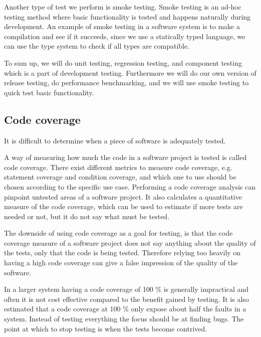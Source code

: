 \bigskip

Another type of test we perform is smoke testing.
Smoke testing is an ad-hoc testing method where basic functionality is tested and happens naturally during development\cite{smoke_testing}.
An example of smoke testing in a software system is to make a compilation and see if it succeeds, since we use a statically typed language,
we can use the type system to check if all types are compatible.

To sum up, we will do unit testing, regression testing, and component testing which is a part of development testing. 
Furthermore we will do our own version of release testing, do performance benchmarking, 
and we will use smoke testing to quick test basic functionality.

\subsection{Code coverage}\label{subsec:code_coverage}
It is difficult to determine when a piece of software is adequately tested.

A way of measuring how much the code in a software project is tested is called code coverage.
There exist different metrics to measure code coverage, e.g. statement coverage and condition coverage,
and which one to use should be chosen according to the specific use case.
Performing a code coverage analysis can pinpoint untested areas of a software project.
It also calculates a quantitative measure of the code coverage, 
which can be used to estimate if more tests are needed or not, 
but it do not say what must be tested.\cite{code_coverage}

The downside of using code coverage as a goal for testing, 
is that the code coverage measure of a software project does not say anything about the quality of the tests, 
only that the code is being tested.
Therefore relying too heavily on having a high code coverage can give a false impression of the quality of the software.\cite{code_coverage_neg}

In a larger system having a code coverage of 100 \% is generally impractical and often it is not cost effective compared to the benefit gained by testing.
It is also estimated that a code coverage at 100 \% only expose about half the faults in a system.
Instead of testing everything the focus should be at finding bugs.
The point at which to stop testing is when the tests become contrived.\cite{code_coverage_not_100}

\bigskip

